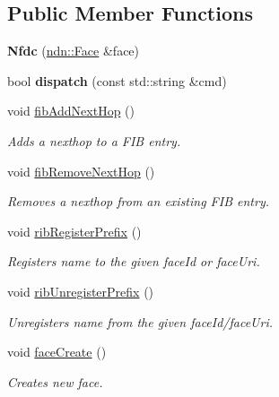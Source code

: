 \subsection*{Public Member Functions}
\begin{DoxyCompactItemize}
\item 
{\bfseries Nfdc} (\hyperlink{classndn_1_1Face}{ndn\+::\+Face} \&face)\hypertarget{classnfdc_1_1Nfdc_ad3febaa55711bc50a4559dcab5f902ce}{}\label{classnfdc_1_1Nfdc_ad3febaa55711bc50a4559dcab5f902ce}

\item 
bool {\bfseries dispatch} (const std\+::string \&cmd)\hypertarget{classnfdc_1_1Nfdc_ad2bcb22925037193bf209985eebf7a30}{}\label{classnfdc_1_1Nfdc_ad2bcb22925037193bf209985eebf7a30}

\item 
void \hyperlink{classnfdc_1_1Nfdc_a263c05fe12729146b99480d6b0c31cc1}{fib\+Add\+Next\+Hop} ()
\begin{DoxyCompactList}\small\item\em Adds a nexthop to a F\+IB entry. \end{DoxyCompactList}\item 
void \hyperlink{classnfdc_1_1Nfdc_a11236dbfbcb3ead96cead12756ec9501}{fib\+Remove\+Next\+Hop} ()
\begin{DoxyCompactList}\small\item\em Removes a nexthop from an existing F\+IB entry. \end{DoxyCompactList}\item 
void \hyperlink{classnfdc_1_1Nfdc_ace29388d8001dc8b98f184ddb5d2b6d8}{rib\+Register\+Prefix} ()
\begin{DoxyCompactList}\small\item\em Registers name to the given face\+Id or face\+Uri. \end{DoxyCompactList}\item 
void \hyperlink{classnfdc_1_1Nfdc_a512d31343edffd32bb33162b735a0a76}{rib\+Unregister\+Prefix} ()
\begin{DoxyCompactList}\small\item\em Unregisters name from the given face\+Id/face\+Uri. \end{DoxyCompactList}\item 
void \hyperlink{classnfdc_1_1Nfdc_a32265a4addbb381b233f7157afd8c68c}{face\+Create} ()
\begin{DoxyCompactList}\small\item\em Creates new face. \end{DoxyCompactList}\item 

\end{DoxyCompactItemize}
